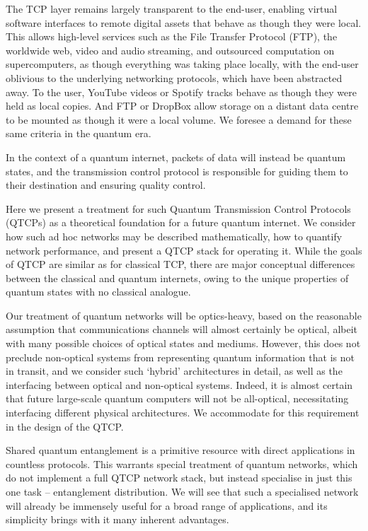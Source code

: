 The TCP layer remains largely transparent to the end-user, enabling virtual software interfaces to remote digital assets that behave as though they were local. This allows high-level services such as the File Transfer Protocol (FTP), the worldwide web, video and audio streaming, and outsourced computation on supercomputers, as though everything was taking place locally, with the end-user oblivious to the underlying networking protocols, which have been abstracted away. To the user, YouTube videos or Spotify tracks behave as though they were held as local copies. And FTP or DropBox allow storage on a distant data centre to be mounted as though it were a local volume. We foresee a demand for these same criteria in the quantum era.

In the context of a quantum internet, packets of data will instead be quantum states, and the transmission control protocol is responsible for guiding them to their destination and ensuring quality control.

Here we present a treatment for such Quantum Transmission Control Protocols (QTCPs) as a theoretical foundation for a future quantum internet. We consider how such ad hoc networks may be described mathematically, how to quantify network performance, and present a QTCP stack for operating it. While the goals of QTCP are similar as for classical TCP, there are major conceptual differences between the classical and quantum internets, owing to the unique properties of quantum states with no classical analogue.

Our treatment of quantum networks will be optics-heavy, based on the reasonable assumption that communications channels will almost certainly be optical, albeit with many possible choices of optical states and mediums. However, this does not preclude non-optical systems from representing quantum information that is not in transit, and we consider such `hybrid' architectures in detail, as well as the interfacing between optical and non-optical systems. Indeed, it is almost certain that future large-scale quantum computers will not be all-optical, necessitating interfacing different physical architectures. We accommodate for this requirement in the design of the QTCP.

Shared quantum entanglement is a primitive resource with direct applications in countless protocols. This warrants special treatment of quantum networks, which do not implement a full QTCP network stack, but instead specialise in just this one task -- entanglement distribution. We will see that such a specialised network will already be immensely useful for a broad range of applications, and its simplicity brings with it many inherent advantages.

